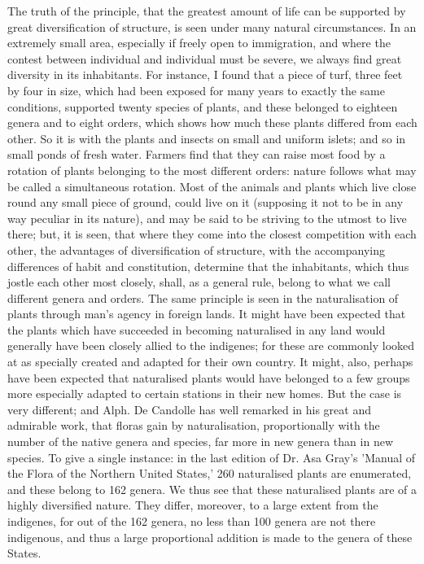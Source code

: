 The truth of the principle, that the greatest amount of life can be supported by great diversification of structure, is seen under many natural circumstances. In an extremely small area, especially if freely open to immigration, and where the contest between individual and individual must be severe, we always find great diversity in its inhabitants. For instance, I found that a piece of turf, three feet by four in size, which had been exposed for many years to exactly the same conditions, supported twenty species of plants, and these belonged to eighteen genera and to eight orders, which shows how much these plants differed from each other. So it is with the plants and insects on small and uniform islets; and so in small ponds of fresh water. Farmers find that they can raise most food by a rotation of plants belonging to the most different orders: nature follows what may be called a simultaneous rotation. Most of the animals and plants which live close round any small piece of ground, could live on it (supposing it not to be in any way peculiar in its nature), and may be said to be striving to the utmost to live there; but, it is seen, that where they come into the closest competition with each other, the advantages of diversification of structure, with the accompanying differences of habit and constitution, determine that the inhabitants, which thus jostle each other most closely, shall, as a general rule, belong to what we call different genera and orders.
The same principle is seen in the naturalisation of plants through man's agency in foreign lands. It might have been expected that the plants which have succeeded in becoming naturalised in any land would generally have been closely allied to the indigenes; for these are commonly looked at as specially created and adapted for their own country. It might, also, perhaps have been expected that naturalised plants would have belonged to a few groups more especially adapted to certain stations in their new homes. But the case is very different; and Alph. De Candolle has well remarked in his great and admirable work, that floras gain by naturalisation, proportionally with the number of the native genera and species, far more in new genera than in new species. To give a single instance: in the last edition of Dr. Asa Gray's 'Manual of the Flora of the Northern United States,' 260 naturalised plants are enumerated, and these belong to 162 genera. We thus see that these naturalised plants are of a highly diversified nature. They differ, moreover, to a large extent from the indigenes, for out of the 162 genera, no less than 100 genera are not there indigenous, and thus a large proportional addition is made to the genera of these States.

